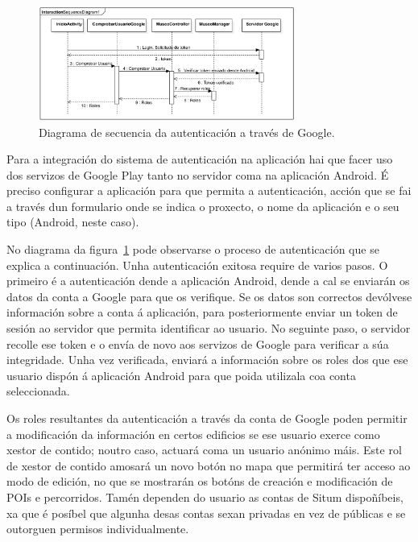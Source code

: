\begin{figure}[!h]
	\begin{center}
		\includegraphics[width=0.75\textwidth]{figures/diagrama/secuenciaAutenticacionGoogle}
		\caption{Diagrama de secuencia da autenticación a través de Google.}
		\label{fig:secuenciaAutenticacionGoogle}
	\end{center}
\end{figure}

Para a integración do sistema de autenticación na aplicación hai que facer uso dos servizos de Google Play tanto no servidor coma na aplicación Android. É preciso configurar a aplicación para que permita a autenticación, acción que se fai a través dun formulario onde se indica o proxecto, o nome da aplicación e o seu tipo (Android, neste caso).

No diagrama da figura~\ref{fig:secuenciaAutenticacionGoogle} pode observarse o proceso de autenticación que se explica a continuación. Unha autenticación exitosa require de varios pasos. O primeiro é a autenticación dende a aplicación Android, dende a cal se enviarán os datos da conta a Google para que os verifique. Se os datos son correctos devólvese información sobre a conta á aplicación, para posteriormente enviar un token de sesión ao servidor que permita identificar ao usuario. No seguinte paso, o servidor recolle ese token e o envía de novo aos servizos de Google para verificar a súa integridade. Unha vez verificada, enviará a información sobre os roles dos que ese usuario dispón á aplicación Android para que poida utilizala coa conta seleccionada.

Os roles resultantes da autenticación a través da conta de Google poden permitir a modificación da información en certos edificios se ese usuario exerce como xestor de contido; noutro caso, actuará coma un usuario anónimo máis. Este rol de xestor de contido amosará un novo botón no mapa que permitirá ter acceso ao modo de edición, no que se mostrarán os botóns de creación e modificación de POIs e percorridos. Tamén dependen do usuario as contas de Situm dispoñíbeis, xa que é posíbel que algunha desas contas sexan privadas en vez de públicas e se outorguen permisos individualmente.

